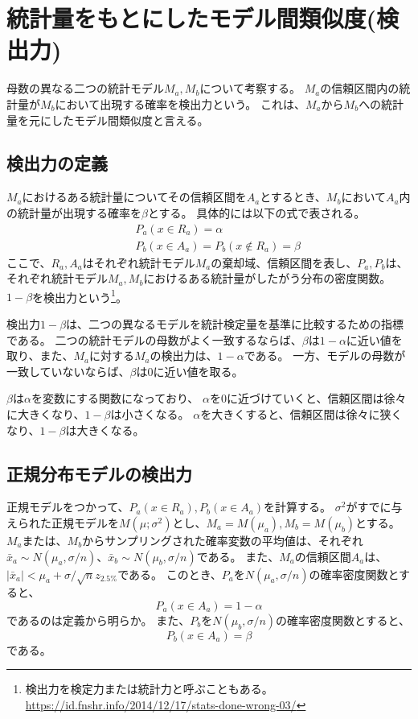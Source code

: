 \section{統計量をもとにしたモデル間類似度(検出力)}
母数の異なる二つの統計モデル$M_a,M_b$について考察する。
$M_a$の信頼区間内の統計量が$M_b$において出現する確率を検出力という。
これは、$M_a$から$M_b$への統計量を元にしたモデル間類似度と言える。

\subsection{検出力の定義}
$M_a$におけるある統計量についてその信頼区間を$A_a$とするとき、$M_b$において$A_a$内の統計量が出現する確率を$\beta$とする。
具体的には以下の式で表される。
\begin{eqnarray*}
    & &P_a(x \in R_a) = \alpha\\
    & & P_b(x \in A_a) = P_b(x\notin R_a )=\beta
\end{eqnarray*}
ここで、$R_a,A_a$はそれぞれ統計モデル$M_a$の棄却域、信頼区間を表し、$P_a,P_b$は、それぞれ統計モデル$M_a,M_b$におけるある統計量がしたがう分布の密度関数。
$1-\beta$を検出力という\footnote{検出力を検定力または統計力と呼ぶこともある。\\ \url{https://id.fnshr.info/2014/12/17/stats-done-wrong-03/}}。


検出力$1-\beta$は、二つの異なるモデルを統計検定量を基準に比較するための指標である。
二つの統計モデルの母数がよく一致するならば、$\beta$は$1-\alpha$に近い値を取り、また、$M_a$に対する$M_a$の検出力は、$1-\alpha$である。
一方、モデルの母数が一致していないならば、$\beta$は0に近い値を取る。

$\beta$は$\alpha$を変数にする関数になっており、
$\alpha$を0に近づけていくと、信頼区間は徐々に大きくなり、$1-\beta$は小さくなる。
$\alpha$を大きくすると、信頼区間は徐々に狭くなり、$1-\beta$は大きくなる。



\subsection{正規分布モデルの検出力}
正規モデルをつかって、$P_a(x \in R_a),P_b(x \in A_a)$を計算する。
$\sigma^2$がすでに与えられた正規モデルを$M(\mu;\sigma^2)$とし、$M_a=M(\mu_a),M_b=M(\mu_b)$とする。
$M_a$または、$M_b$からサンプリングされた確率変数の平均値は、それぞれ$\bar{x}_a\sim N(\mu_a,\sigma/n)$、$\bar{x}_b\sim N(\mu_b,\sigma/n)$である。
また、$M_a$の信頼区間$A_a$は、$|\bar{x}_a|<\mu_a+\sigma / \sqrt{n}z_{2.5\%}$である。
このとき、$P_a$を$N(\mu_a,\sigma/n)$の確率密度関数とすると、
\begin{equation*}
    P_a(x \in A_a) = 1-\alpha
\end{equation*}
であるのは定義から明らか。
また、$P_b$を$N(\mu_b,\sigma/n)$の確率密度関数とすると、
\begin{equation*}
    P_b(x \in A_a ) = \beta
\end{equation*}
である。

